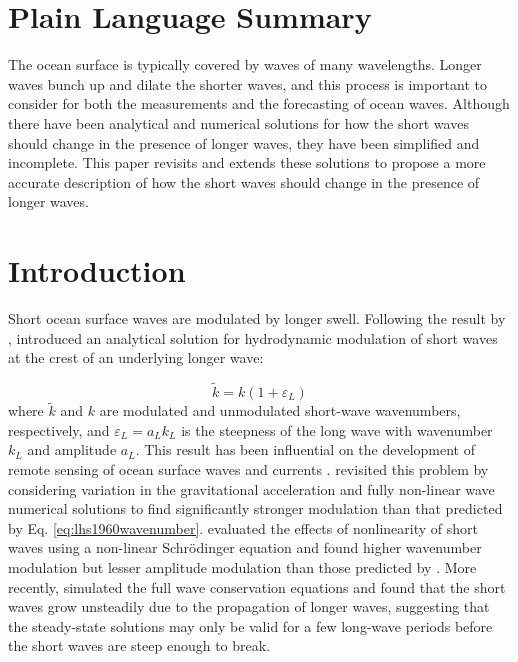 \documentclass[draft]{agujournal2019}
\begin{document}
\section*{Plain Language Summary}
The ocean surface is typically covered by waves of many wavelengths.
Longer waves bunch up and dilate the shorter waves, and this process is
important to consider for both the measurements and the forecasting of ocean
waves.
Although there have been analytical and numerical solutions for how the short
waves should change in the presence of longer waves, they have been simplified
and incomplete.
This paper revisits and extends these solutions to propose a more accurate
description of how the short waves should change in the presence of longer
waves.

\section{Introduction}

Short ocean surface waves are modulated by longer swell.
Following the result by ,
 introduced an analytical solution for hydrodynamic
modulation of short waves at the crest of an underlying longer wave:

\begin{equation}
\label{eq:lhs1960wavenumber}
\widetilde{k} = k (1 + \varepsilon_L)
\end{equation}
where $\widetilde{k}$ and $k$ are modulated and unmodulated short-wave wavenumbers,
respectively, and $\varepsilon_L = a_L k_L$ is the steepness of the long wave with
wavenumber $k_L$ and amplitude $a_L$.
This result has been influential on the development of remote sensing of ocean
surface waves and currents \cite{keller1975microwave,hara1994hydrodynamic}.
 revisited this problem by considering variation
in the gravitational acceleration and fully non-linear wave numerical solutions
to find significantly stronger modulation than that predicted by
Eq. \ref{eq:lhs1960wavenumber}.
 evaluated the effects of nonlinearity of short waves
using a non-linear Schr\" odinger equation and found higher wavenumber
modulation but lesser amplitude modulation than those predicted by
.
More recently, \cite{peureux2021unsteady} simulated the full wave conservation
equations and found that the short waves grow unsteadily due to the propagation of
longer waves, suggesting that the steady-state solutions may only be valid for
a few long-wave periods before the short waves are steep enough to break. 
\end{document}
